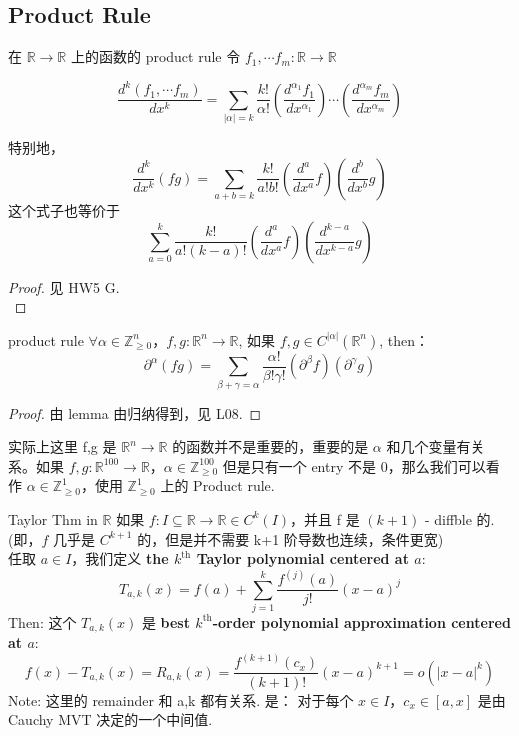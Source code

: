 \documentclass[lang=cn,11pt]{elegantbook}
\begin{document}
\subsection{Product Rule}

\begin{lemma}{在 $\mathbb{R} \rightarrow \mathbb{R}$ 上的函数的 product rule}
令 $f_1, \cdots f_m: \mathbb{R} \rightarrow \mathbb{R}$

$$
\frac{d^k {(f_1,\cdots f_m)}}{dx^k} = \sum_{|\alpha| = k} \frac{k!}{\alpha !} (\frac{d^{\alpha_1} f_1}{dx^{\alpha_1}}) \cdots (\frac{d^{\alpha_m} f_m}{dx^{\alpha_m}})
$$

\end{lemma}

\begin{note}
    特别地，$$
    \frac{d^k}{dx^k} (fg) = \sum_{a+b = k} \frac{k!}{a!b!} (\frac{d^a}{dx^a}f) (\frac{d^b}{dx^b} g)
    $$
    这个式子也等价于 $$
    \sum_{a = 0}^k \frac{k!}{a!(k-a)!} (\frac{d^a}{dx^a}f) (\frac{d^{k-a}}{dx^{k-a}} g)
    $$
\end{note}

\begin{proof}
    见 HW5 G. \\
\end{proof}

\begin{theorem}{product rule} \label{product rule}
$\forall \alpha \in \mathbb{Z}_{\geq 0}^n$，$f,g: \mathbb{R}^n \rightarrow \mathbb{R}$, 如果 $f,g \in C^{|\alpha|} (\mathbb{R}^n)$, then：
$$
\partial^{\alpha} (fg) = \sum_{\beta + \gamma = \alpha} \frac{\alpha !}{\beta ! \gamma !} (\partial ^ \beta f) (\partial ^ \gamma g)
$$
\end{theorem}
\begin{proof}
    由 lemma 由归纳得到，见 L08.
\end{proof}
\begin{note}
    实际上这里 f,g 是 $\mathbb{R}^n \rightarrow \mathbb{R}$ 的函数并不是重要的，重要的是 $\alpha$ 和几个变量有关系。如果 $f,g:\mathbb{R}^{100} \rightarrow \mathbb{R} $，$\alpha \in \mathbb{Z}_{\geq 0} ^{100}$ 但是只有一个 entry 不是 0，那么我们可以看作 $\alpha \in \mathbb{Z}_{\geq 0}^1$，使用 $\mathbb{Z}_{\geq 0}^1$ 上的 Product rule.
\end{note}


\begin{lemma}{Taylor Thm in $\mathbb{R}$}
如果 $f: I \subseteq \mathbb{R} \rightarrow \mathbb{R} \in C^k(I)$，并且 f 是 $(k+1)$ - diffble 的.\\
(即，$f$ 几乎是 $C^{k+1}$ 的，但是并不需要 k+1 阶导数也连续，条件更宽)\\
任取 $a \in I$，我们定义 \textbf{the $k^\text{th}$ Taylor polynomial centered at $a$}:
$$
T_{a,k}(x) = f(a) + \sum_{j=1}^k \frac{f^{(j)}(a)}{j!} (x-a)^j
$$
Then: 这个 $T_{a,k}(x)$ 是 \textbf{best $k^\text{th}$-order polynomial approximation centered at $a$}: $$
f(x) - T_{a,k}(x) =  R_{a,k} (x) = \frac{f^{(k+1)}(c_x)}{(k+1)!} (x-a)^{k+1} = o(|x-a|^k)
$$
Note: 这里的 remainder 和 a,k 都有关系. 是：
对于每个 $x \in I$，$c_x \in [a,x]$ 是由 Cauchy MVT 决定的一个中间值.
\end{lemma}
\end{document}

